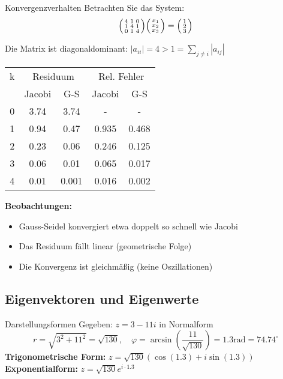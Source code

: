 \begin{example2}{Konvergenzverhalten}
Betrachten Sie das System:
$$\begin{psmallmatrix}
4 & 1 & 0\\
1 & 4 & 1\\
0 & 1 & 4
\end{psmallmatrix}
\begin{psmallmatrix}
x_1\\
x_2\\
x_3
\end{psmallmatrix} =
\begin{psmallmatrix}
1\\
2\\
3
\end{psmallmatrix}$$

Die Matrix ist diagonaldominant:
$|a_{ii}| = 4 > 1 = \sum_{j\neq i} |a_{ij}|$

\begin{center}
\begin{tabular}{c|cc|cc}
k & \multicolumn{2}{c|}{Residuum} & \multicolumn{2}{c}{Rel. Fehler}\\
& Jacobi & G-S & Jacobi & G-S\\
\hline
0 & 3.74 & 3.74 & - & -\\
1 & 0.94 & 0.47 & 0.935 & 0.468\\
2 & 0.23 & 0.06 & 0.246 & 0.125\\
3 & 0.06 & 0.01 & 0.065 & 0.017\\
4 & 0.01 & 0.001 & 0.016 & 0.002
\end{tabular}
\end{center}

\textbf{Beobachtungen:}
\begin{itemize}
    \item Gauss-Seidel konvergiert etwa doppelt so schnell wie Jacobi
    \item Das Residuum fällt linear (geometrische Folge)
    \item Die Konvergenz ist gleichmäßig (keine Oszillationen)
\end{itemize}
\end{example2}

\columnbreak

\subsection{Eigenvektoren und Eigenwerte}

\begin{example2}{Darstellungsformen}
Gegeben: $z = 3 - 11i$ in Normalform
$$r = \sqrt{3^2 + 11^2} = \sqrt{130}, \quad \varphi = \arcsin(\frac{11}{\sqrt{130}}) = 1.3 \text{rad} = 74.74^{\circ}$$
\textbf{Trigonometrische Form:} $z = \sqrt{130}(\cos(1.3) + i\sin(1.3))$
\vspace{2mm}\\
\textbf{Exponentialform:} $z = \sqrt{130}e^{i\cdot 1.3}$
\end{example2}

